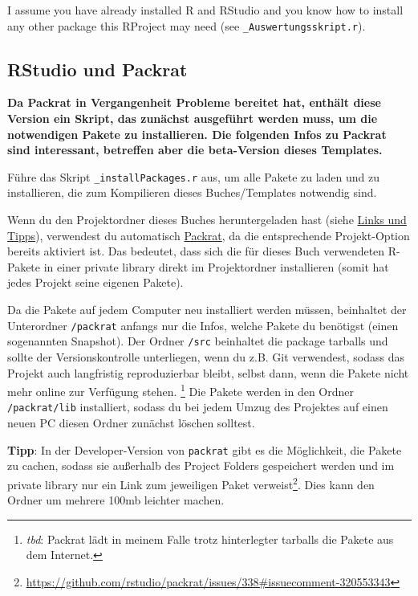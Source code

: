 \documentclass[]{book}
\let\rmarkdownfootnote\footnote%
\def\footnote{\protect\rmarkdownfootnote}
\theoremstyle{definition}
\theoremstyle{definition}
\theoremstyle{remark}
\let\BeginKnitrBlock\begin \let\EndKnitrBlock\end
\begin{document}
I assume you have already installed R and RStudio and you know how to
install any other package this RProject may need (see
\texttt{\_Auswertungsskript.r}).

\hypertarget{rstudio-und-packrat}{\subsection*{RStudio und
Packrat}\label{rstudio-und-packrat}}

\textbf{Da Packrat in Vergangenheit Probleme bereitet hat, enthält diese
Version ein Skript, das zunächst ausgeführt werden muss, um die
notwendigen Pakete zu installieren. Die folgenden Infos zu Packrat sind
interessant, betreffen aber die beta-Version dieses Templates.}

\BeginKnitrBlock{rmdcaution}
Führe das Skript \texttt{\_installPackages.r} aus, um alle Pakete zu
laden und zu installieren, die zum Kompilieren dieses Buches/Templates
notwendig sind.
\EndKnitrBlock{rmdcaution}

Wenn du den Projektordner dieses Buches heruntergeladen hast (siehe
\protect\hyperlink{links-und-tipps}{Links und Tipps}), verwendest du
automatisch \href{https://rstudio.github.io/packrat/}{Packrat}, da die
entsprechende Projekt-Option bereits aktiviert ist. Das bedeutet, dass
sich die für dieses Buch verwendeten R-Pakete in einer private library
direkt im Projektordner installieren (somit hat jedes Projekt seine
eigenen Pakete).

Da die Pakete auf jedem Computer neu installiert werden müssen,
beinhaltet der Unterordner \texttt{/packrat} anfangs nur die Infos,
welche Pakete du benötigst (einen sogenannten Snapshot). Der Ordner
\texttt{/src} beinhaltet die package tarballs und sollte der
Versionskontrolle unterliegen, wenn du z.B. Git verwendest, sodass das
Projekt auch langfristig reproduzierbar bleibt, selbst dann, wenn die
Pakete nicht mehr online zur Verfügung stehen. \footnote{\emph{tbd}:
  Packrat lädt in meinem Falle trotz hinterlegter tarballs die Pakete
  aus dem Internet.} Die Pakete werden in den Ordner
\texttt{/packrat/lib} installiert, sodass du bei jedem Umzug des
Projektes auf einen neuen PC diesen Ordner zunächst löschen solltest.

\textbf{Tipp}: In der Developer-Version von \texttt{packrat} gibt es die
Möglichkeit, die Pakete zu cachen, sodass sie außerhalb des Project
Folders gespeichert werden und im private library nur ein Link zum
jeweiligen Paket verweist\footnote{\url{https://github.com/rstudio/packrat/issues/338\#issuecomment-320553343}}.
Dies kann den Ordner um mehrere 100mb leichter machen.
\end{document}
